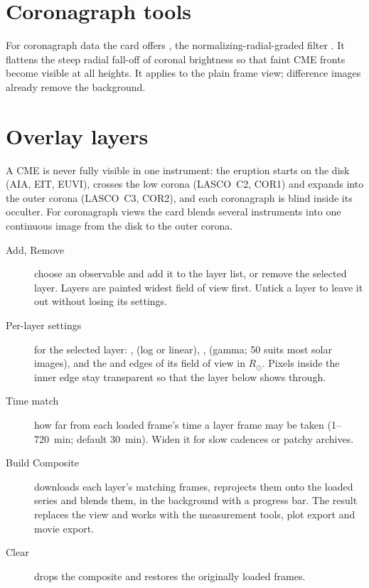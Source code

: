 \section{Coronagraph tools}
\label{sec:nrgf}

For coronagraph data the  card offers , the
normalizing-radial-graded filter \parencite{morgan2006}. It flattens the steep radial fall-off
of coronal brightness so that faint CME fronts become visible at all heights. It applies to
the plain frame view; difference images already remove the background.

\section{Overlay layers}
\label{sec:overlay-layers}

A CME is never fully visible in one instrument: the eruption starts on the disk (AIA, EIT,
EUVI), crosses the low corona (LASCO~C2, COR1) and expands into the outer corona (LASCO~C3,
COR2), and each coronagraph is blind inside its occulter. For coronagraph views the
 card blends several instruments into one continuous image from the disk
to the outer corona.

\begin{description}
  \item[Add, Remove] choose an observable and add it to the layer list, or remove the
    selected layer. Layers are painted widest field of view first. Untick a layer to leave it
    out without losing its settings.
  \item[Per-layer settings] for the selected layer: ,  (log or
    linear), ,  (gamma; 50 suits most solar images), and the
     and  edges of its field of view in \(R_\odot\). Pixels inside the
    inner edge stay transparent so that the layer below shows through.
  \item[Time match] how far from each loaded frame's time a layer frame may be taken
    (1--720~min; default 30~min). Widen it for slow cadences or patchy archives.
  \item[Build Composite] downloads each layer's matching frames, reprojects them onto the
    loaded series and blends them, in the background with a progress bar. The result replaces
    the view and works with the measurement tools, plot export and movie export.
  \item[Clear] drops the composite and restores the originally loaded frames.
\end{description}

